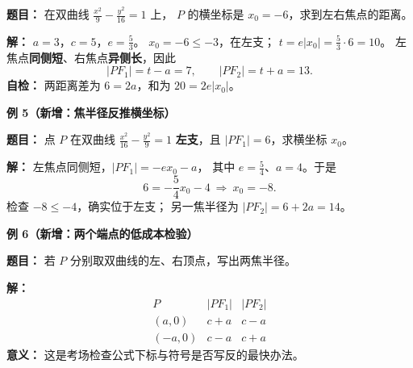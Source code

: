 \begin{examplebox}
\textbf{题目：}
在双曲线 $\frac{x^2}{9}-\frac{y^2}{16}=1$ 上，
$P$ 的横坐标是 $x_0=-6$，求到左右焦点的距离。

\textbf{解：} $a=3$，$c=5$，$e=\frac53$。
$x_0=-6\le-3$，在左支；
$t=e|x_0|=\frac53\cdot6=10$。
左焦点\textbf{同侧短}、右焦点\textbf{异侧长}，因此
\[
 \boxed{|PF_1|=t-a=7},\qquad
 \boxed{|PF_2|=t+a=13}.
\]
\textbf{自检：} 两距离差为 $6=2a$，和为 $20=2e|x_0|$。

\medskip
\textbf{\textcolor{CExample}{例 5（新增：焦半径反推横坐标）}}

\textbf{题目：}
点 $P$ 在双曲线 $\frac{x^2}{16}-\frac{y^2}{9}=1$
\textbf{左支}，且 $|PF_1|=6$，求横坐标 $x_0$。

\textbf{解：} 左焦点同侧短，$|PF_1|=-ex_0-a$，
其中 $e=\frac54$、$a=4$。于是
\[
 6=-\frac54x_0-4
 \ \Longrightarrow\ \boxed{x_0=-8}.
\]
检查 $-8\le-4$，确实位于左支；
另一焦半径为 $|PF_2|=6+2a=14$。

\medskip
\textbf{\textcolor{CExample}{例 6（新增：两个端点的低成本检验）}}

\textbf{题目：}
若 $P$ 分别取双曲线的左、右顶点，写出两焦半径。

\textbf{解：}
\[
 \begin{array}{c|cc}
   P&|PF_1|&|PF_2|\\ \hline
   (a,0)&c+a&c-a\\
   (-a,0)&c-a&c+a
 \end{array}
\]
\textbf{意义：} 这是考场检查公式下标与符号是否写反的最快办法。

\end{examplebox}

